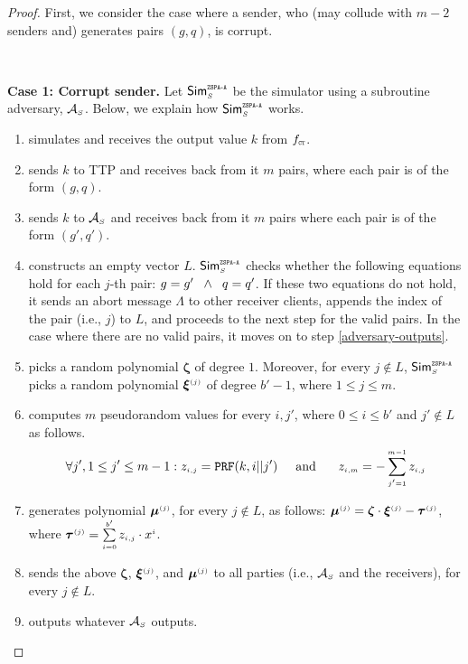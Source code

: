 \begin{proof}
First, we consider the case where a sender, who (may collude with $m-2$ senders and) generates pairs $(g,q)$, is corrupt. 

\

\noindent\textbf{Case 1: Corrupt sender.}  Let $\mathsf{Sim}^{\scriptscriptstyle \mathtt{ZSPA\text{-}A}}_{\scriptscriptstyle S}$ be the simulator using a subroutine adversary, $\mathcal{A}_{\scriptscriptstyle S}$. Below, we explain how $\mathsf{Sim}^{\scriptscriptstyle \mathtt{ZSPA\text{-}A}}_{\scriptscriptstyle S}$ works.  


\begin{enumerate}
%
\item simulates  \ct  and receives the output value $ k$ from $f_{\scriptscriptstyle \mathtt{CT}}$.
%
\item sends $ k$ to TTP and receives back from it $m$ pairs, where each pair is of the form $( g,  q)$. 
%
\item sends $ k$ to $\mathcal{A}_{\scriptscriptstyle S}$ and receives back from it $m$ pairs  where each pair is of the form $( g',  q')$. 
%

\item constructs an empty vector $ L$. $\mathsf{Sim}^{\scriptscriptstyle \mathtt{ZSPA\text{-}A}}_{\scriptscriptstyle S}$ checks whether the following equations hold for each $j$-th pair: $ g= g' \hspace{2mm} \wedge  \hspace{2mm}  q= q'$. If these two equations do not hold, it sends an abort message $\Lambda$ to other receiver clients, appends the index of the pair (i.e., $j$) to $ L$, and proceeds to the next step for the valid pairs. In the case where there are no valid pairs, it moves on to step \ref{adversary-outputs}. 
%
\item picks a random polynomial ${\bm \zeta}$ of degree $1$. Moreover, for every $j\notin  L$, $\mathsf{Sim}^{\scriptscriptstyle \mathtt{ZSPA\text{-}A}}_{\scriptscriptstyle S}$ picks a random polynomial ${\bm\xi}^{\scriptscriptstyle (j)}$ of degree $b'-1$, where $1\leq j \leq m$.
%

\item computes $m$ pseudorandom values  for every $i,j'$, where $0\leq i \leq b'$ and $j'\notin  L$ as follows.   
%
$$\forall j', 1\leq j' \leq m-1: z_{\scriptscriptstyle i,j}=\mathtt{PRF}( k,i||j')\hspace{5mm}  \text{and }\hspace{5mm} z_{\scriptscriptstyle i,m}=-\sum\limits^{\scriptscriptstyle m-1}_{\scriptscriptstyle j'=1}z_{\scriptscriptstyle i,j}$$ 
%
 \item generates polynomial ${\bm\mu}^{\scriptscriptstyle (j)}$, for every $j \notin L$, as follows:
   ${\bm\mu}^{\scriptscriptstyle (j)} = {\bm\zeta}\cdot {\bm\xi}^{\scriptscriptstyle (j)}-\bm\tau^{\scriptscriptstyle (j)}$, where ${\bm\tau}^{\scriptscriptstyle (j)}=\sum\limits^{\scriptscriptstyle b'}_{\scriptscriptstyle i=0}z_{\scriptscriptstyle i,j}\cdot x^{\scriptscriptstyle i}$.
%
\item sends the above ${\bm \zeta}$,  ${\bm\xi}^{\scriptscriptstyle (j)}$, and ${\bm\mu}^{\scriptscriptstyle (j)}$ to all parties (i.e., $\mathcal{A}_{\scriptscriptstyle S}$ and the receivers), for every $j\notin L$. 
%
\item\label{adversary-outputs} outputs whatever $\mathcal{A}_{\scriptscriptstyle S}$ outputs.
%
 \end{enumerate}


\end{proof}
